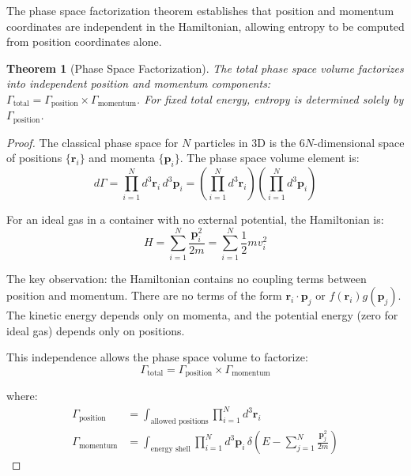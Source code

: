 \documentclass[10pt,twocolumn,letterpaper]{article}
\newtheorem{theorem}{Theorem}[section]
\theoremstyle{definition}
\theoremstyle{remark}
\begin{document}
The phase space factorization theorem establishes that position and momentum coordinates are independent in the Hamiltonian, allowing entropy to be computed from position coordinates alone.

\begin{theorem}[Phase Space Factorization]
\label{thm:phase_space}
The total phase space volume factorizes into independent position and momentum components: $\Gamma_{\text{total}} = \Gamma_{\text{position}} \times \Gamma_{\text{momentum}}$. For fixed total energy, entropy is determined solely by $\Gamma_{\text{position}}$.
\end{theorem}

\begin{proof}
The classical phase space for $N$ particles in 3D is the $6N$-dimensional space of positions $\{\mathbf{r}_i\}$ and momenta $\{\mathbf{p}_i\}$. The phase space volume element is:
\begin{equation}
d\Gamma = \prod_{i=1}^{N} d^3\mathbf{r}_i \, d^3\mathbf{p}_i = \left(\prod_{i=1}^{N} d^3\mathbf{r}_i\right) \left(\prod_{i=1}^{N} d^3\mathbf{p}_i\right)
\label{eq:phase_space_element}
\end{equation}

For an ideal gas in a container with no external potential, the Hamiltonian is:
\begin{equation}
H = \sum_{i=1}^{N} \frac{\mathbf{p}_i^2}{2m} = \sum_{i=1}^{N} \frac{1}{2}m v_i^2
\label{eq:hamiltonian}
\end{equation}

The key observation: the Hamiltonian contains no coupling terms between position and momentum. There are no terms of the form $\mathbf{r}_i \cdot \mathbf{p}_j$ or $f(\mathbf{r}_i) g(\mathbf{p}_j)$. The kinetic energy depends only on momenta, and the potential energy (zero for ideal gas) depends only on positions.

This independence allows the phase space volume to factorize:
\begin{equation}
\Gamma_{\text{total}} = \Gamma_{\text{position}} \times \Gamma_{\text{momentum}}
\label{eq:factorization}
\end{equation}

where:
\begin{align}
\Gamma_{\text{position}} &= \int_{\text{allowed positions}} \prod_{i=1}^{N} d^3\mathbf{r}_i \label{eq:gamma_position}\\
\Gamma_{\text{momentum}} &= \int_{\text{energy shell}} \prod_{i=1}^{N} d^3\mathbf{p}_i \, \delta\left(E - \sum_{j=1}^{N} \frac{\mathbf{p}_j^2}{2m}\right) \label{eq:gamma_momentum}
\end{align}


\end{proof}
\end{document}
